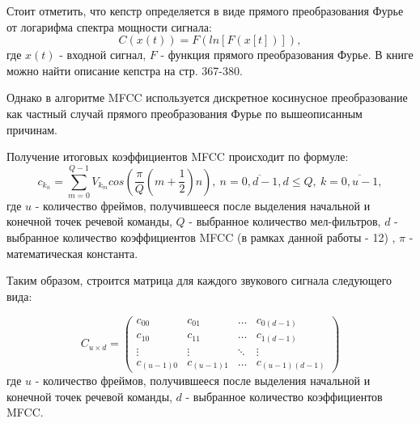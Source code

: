 Стоит отметить, что кепстр определяется в виде прямого преобразования Фурье от логарифма спектра мощности сигнала:
\begin{equation}
	C(x(t))=F(ln[F(x[t])]),
\end{equation}
где $x(t)$ - входной сигнал, $F$ - функция прямого преобразования Фурье. В книге \cite{CeptrumExplanation} можно найти описание кепстра на стр. 367-380. 

Однако в алгоритме MFCC используется дискретное косинусное преобразование как частный случай прямого преобразования Фурье по вышеописанным причинам.

Получение итоговых коэффициентов MFCC происходит по формуле:
\begin{equation}
	c_{k_n} = \sum_{m=0}^{Q-1} V_{k_m} cos(\dfrac{\pi}{Q} (m+\dfrac{1}{2})n),~n=\overline{0,d-1},d \le Q,~k=\overline{0,u-1},
\end{equation}
где $u$ - количество фреймов, получившееся после выделения начальной и конечной точек речевой команды, $Q$ - выбранное количество мел-фильтров, $d$ - выбранное количество коэффициентов MFCC (в рамках данной работы - 12) \cite{MFCC}, $\pi$ - математическая константа.

Таким образом, строится матрица для каждого звукового сигнала следующего вида:

\begin{equation*}
	C_{u \times d} = \left(
	\begin{array}{cccc}
		c_{00} & c_{01} & \ldots & c_{0(d-1)}\\
		c_{10} &  c_{11} & \ldots & c_{1(d-1)}\\
		\vdots & \vdots & \ddots & \vdots\\
		c_{(u-1)0} & c_{(u-1)1} & \ldots & c_{(u-1)(d-1)}
	\end{array}
	\right)
\end{equation*}
где $u$ - количество фреймов, получившееся после выделения начальной и конечной точек речевой команды, $d$ - выбранное количество коэффициентов MFCC.

\label{par:unify_coeffs}
